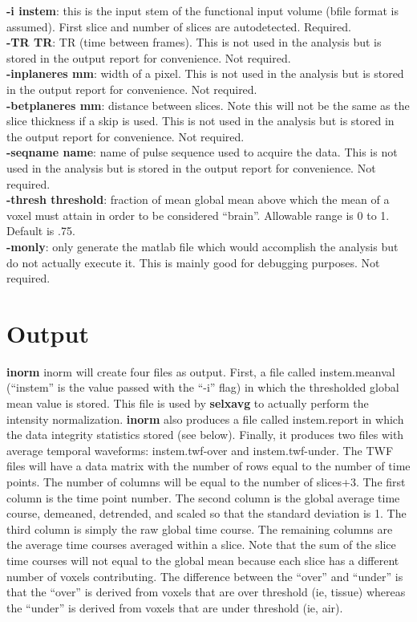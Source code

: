 \documentclass[10pt]{article}
\begin{document}
\noindent
{\bf -i instem}: this is the input stem of the functional input volume
(bfile format is assumed). First slice and number of slices are
autodetected. Required.\\

\noindent
{\bf -TR TR}: TR (time between frames). This is not used in the
analysis but is stored in the output report for convenience. Not
required.\\

\noindent
{\bf -inplaneres mm}: width of a pixel. This is not used in the
analysis but is stored in the output report for convenience. Not
required.\\

\noindent
{\bf -betplaneres mm}: distance between slices. Note this will not be
the same as the slice thickness if a skip is used. This is not used in
the analysis but is stored in the output report for convenience. Not
required.\\

\noindent
{\bf -seqname name}: name of pulse sequence used to acquire the
data. This is not used in the analysis but is stored in the output
report for convenience. Not required.\\

\noindent
{\bf -thresh threshold}: fraction of mean global mean above which the
mean of a voxel must attain in order to be considered ``brain''.
Allowable range is 0 to 1. Default is .75.\\

\noindent
{\bf -monly}: only generate the matlab file which would accomplish the
analysis but do not actually execute it.  This is mainly good for
debugging purposes. Not required.\\

\section{Output}

{\bf inorm} inorm will create four files as output. First, a file
called instem.meanval (``instem'' is the value passed with the ``-i''
flag) in which the thresholded global mean value is stored.  This file
is used by {\bf selxavg} to actually perform the intensity
normalization. {\bf inorm} also produces a file called instem.report
in which the data integrity statistics stored (see below).  Finally,
it produces two files with average temporal waveforms: instem.twf-over
and instem.twf-under. The TWF files will have a data matrix with the
number of rows equal to the number of time points. The number of
columns will be equal to the number of slices+3. The first column is
the time point number. The second column is the global average time
course, demeaned, detrended, and scaled so that the standard deviation
is 1. The third column is simply the raw global time course. The
remaining columns are the average time courses averaged within a
slice. Note that the sum of the slice time courses will not equal to
the global mean because each slice has a different number of voxels
contributing. The difference between the ``over'' and ``under'' is
that the ``over'' is derived from voxels that are over threshold (ie,
tissue) whereas the ``under'' is derived from voxels that are under
threshold (ie, air).
\end{document}
